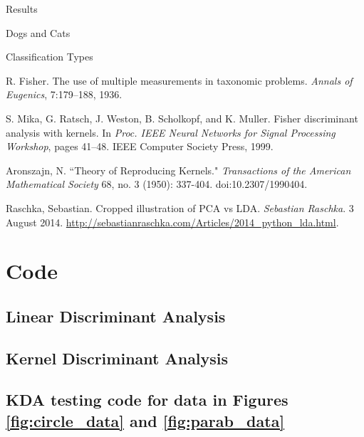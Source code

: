 
\begin{section}{Results}
\begin{homeworkSection}{Dogs and Cats}
\end{homeworkSection}

\begin{homeworkSection}{Classification Types}

\end{homeworkSection}


\end{section}

\newpage

\appendix

\begin{thebibliography}{10}
	R. Fisher. The use of multiple measurements in taxonomic problems. \textit{Annals of Eugenics}, 7:179–188, 1936.

	S. Mika, G. Ratsch, J. Weston, B. Scholkopf, and K. Muller. Fisher discriminant analysis with kernels. In \textit{Proc. IEEE Neural Networks for Signal Processing Workshop}, pages 41–48. IEEE Computer Society Press, 1999.

	Aronszajn, N. ``Theory of Reproducing Kernels." \textit{Transactions of the American Mathematical Society} 68, no. 3 (1950): 337-404. doi:10.2307/1990404.

	Raschka, Sebastian. Cropped illustration of PCA vs LDA. \textit{Sebastian Raschka}. 3 August 2014. \url{http://sebastianraschka.com/Articles/2014_python_lda.html}.
\end{thebibliography}

\section{Code}\label{code}

\subsection{Linear Discriminant Analysis}


\subsection{Kernel Discriminant Analysis}


\subsection{KDA testing code for data in Figures \ref{fig:circle_data} and \ref{fig:parab_data}}



